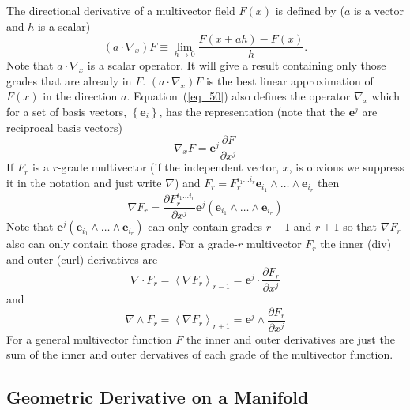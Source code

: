 \documentclass[12pt,twoside,openright]{memoir}
\newcommand{\bm}[1]{\boldsymbol{#1}}
\newcommand{\bfrac}[2]{\displaystyle\frac{#1}{#2}}
\newcommand{\lp}{\left (}
\newcommand{\rp}{\right )}
\newcommand{\pdiff}[2]{\bfrac{\partial {#1}}{\partial {#2}}}
\newcommand{\lbrc}{\left \{}
\newcommand{\rbrc}{\right \}}
\newcommand{\set}[1]{\lbrc {#1} \rbrc}
\newcommand{\W}{\wedge}
\newcommand{\f}[2]{{#1}\lp {#2} \rp}
\newcommand{\paren}[1]{\lp {#1} \rp}
\newcommand{\be}{\begin{equation}}
\newcommand{\ee}{\end{equation}}
\begin{document}
The directional derivative of a multivector field $\f{F}{x}$ is defined by ($a$ is a vector and $h$ is a scalar)
\be\label{eq_50}
 \paren{a\cdot\nabla_{x}}F \equiv \lim_{h\rightarrow 0}\bfrac{\f{F}{x+ah}-\f{F}{x}}{h}.
\ee
Note that $a\cdot\nabla_{x}$ is a scalar operator.  It will give a result containing only those grades
that are already in $F$.  $\paren{a\cdot\nabla_{x}}F$ is the best linear approximation of $\f{F}{x}$
in the direction $a$.  Equation~(\ref{eq_50}) also defines the operator $\nabla_{x}$ which for a set of
basis vectors, $\set{\bm{e}_{i}}$, has the representation (note that the $\bm{e}^{j}$ are reciprocal 
basis vectors)
\begin{equation}
    \nabla_{x} F = \bm{e}^{j}\bfrac{\partial F}{\partial x^{j}}
\end{equation}
If $F_{r}$ is a $r$-grade multivector (if the independent vector, $x$, is obvious we suppress it in the
notation and just write $\nabla$) and
$F_{r} = F_{r}^{i_{1}\dots i_{r}}\bm{e}_{i_{1}}\W\dots\W \bm{e}_{i_{r}}$
then
  \begin{equation}
    \nabla F_{r} = \bfrac{\partial F_{r}^{i_{1}\dots i_{r}}}{\partial x^{j}}\bm{e}^{j}\lp\bm{e}_{i_{1}}\W
                 \dots\W \bm{e}_{i_{r}} \rp
  \end{equation}
Note that
$\bm{e}^{j}\lp\bm{e}_{i_{1}}\W\dots\W \bm{e}_{i_{r}} \rp$
can only contain grades $r-1$ and $r+1$ so that $\nabla F_{r}$
also can only contain those grades. For a grade-$r$ multivector
$F_{r}$ the inner (div) and outer (curl) derivatives are
  \begin{equation}
  \nabla\cdot F_{r} = \left < \nabla F_{r}\right >_{r-1} = \bm{e}^{j}\cdot \pdiff{F_{r}}{x^{j}}
  \end{equation}
and
  \begin{equation}
  \nabla\W F_{r} = \left < \nabla F_{r}\right >_{r+1} = \bm{e}^{j}\W \pdiff{F_{r}}{x^{j}}
  \end{equation}
For a general multivector function $F$ the inner and outer derivatives are
just the sum of the inner and outer dervatives of each grade of the multivector
function.

\subsection{Geometric Derivative on a Manifold}
\end{document}
